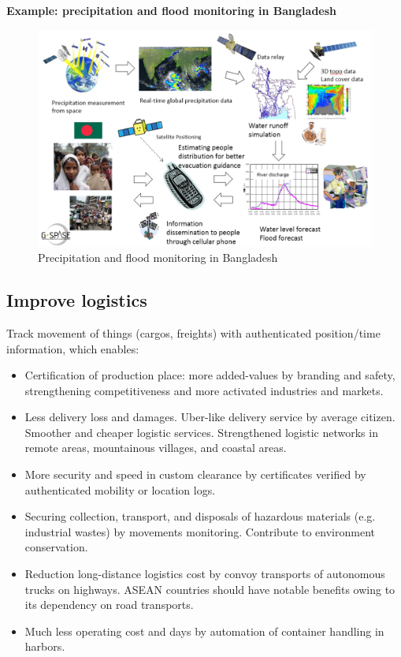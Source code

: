{\flushleft \bfseries Example: precipitation and flood monitoring in Bangladesh}

\begin{figure}[H]
\begin{center}
\includegraphics[width = 0.8\linewidth]{Figures/bangladesh.png}
\end{center}
\caption{Precipitation and flood monitoring in Bangladesh}
\label{bangladesh}
\end{figure}

\subsection{Improve logistics}

Track movement of things (cargos, freights) with authenticated position/time information, which enables:

\begin{itemize}

\item Certification of production place: more added-values by branding and safety, strengthening competitiveness and more activated industries and markets.

\item Less delivery loss and damages. Uber-like delivery service by average citizen. Smoother and cheaper logistic services. Strengthened logistic networks in remote areas, mountainous villages, and coastal areas.

\item More security and speed in custom clearance by certificates verified by authenticated mobility or location logs.

\item Securing collection, transport, and disposals of hazardous materials (e.g. industrial wastes) by movements monitoring. Contribute to environment conservation.

\item Reduction long-distance logistics cost by convoy transports of autonomous trucks on highways. ASEAN countries should have notable benefits owing to its dependency on road transports.

\item Much less operating cost and days by automation of container handling in harbors.

\end{itemize}

